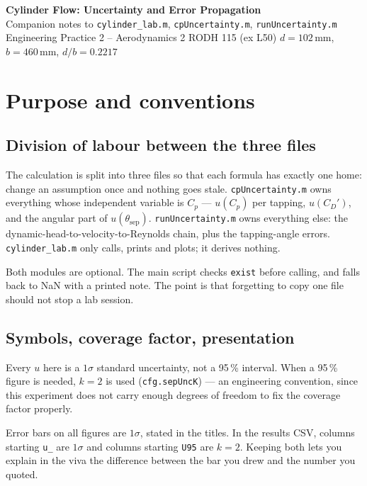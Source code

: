 \documentclass[11pt,a4paper]{article}
\newcommand{\Cp}{\ensuremath{C_p}}
\newcommand{\CD}{\ensuremath{C_D}}
\begin{document}
\begin{center}
{\LARGE\bfseries Cylinder Flow: Uncertainty and Error Propagation}\\[4pt]
{\large Companion notes to \texttt{cylinder\_lab.m}, \texttt{cpUncertainty.m}, \texttt{runUncertainty.m}}\\[8pt]
{\small Engineering Practice 2 -- Aerodynamics 2 \quad\textbar\quad RODH 115 (ex L50)
\quad\textbar\quad $d = 102$\,mm, $b = 460$\,mm, $d/b = 0.2217$}
\end{center}

\vspace{4pt}

\section{Purpose and conventions}

\subsection{Division of labour between the three files}

The calculation is split into three files so that each formula has exactly one home: change an
assumption once and nothing goes stale. \texttt{cpUncertainty.m} owns everything whose independent
variable is \Cp{} --- $u(\Cp)$ per tapping, $u(\CD')$, and the angular part of $u(\theta_{\text{sep}})$.
\texttt{runUncertainty.m} owns everything else: the dynamic-head-to-velocity-to-Reynolds chain, plus
the tapping-angle errors. \texttt{cylinder\_lab.m} only calls, prints and plots; it derives nothing.

Both modules are optional. The main script checks \texttt{exist} before calling, and falls back to
NaN with a printed note. The point is that forgetting to copy one file should not stop a lab session.

\subsection{Symbols, coverage factor, presentation}

Every $u$ here is a $1\sigma$ standard uncertainty, not a 95\,\% interval. When a 95\,\% figure is
needed, $k = 2$ is used (\texttt{cfg.sepUncK}) --- an engineering convention, since this experiment
does not carry enough degrees of freedom to fix the coverage factor properly.

Error bars on all figures are $1\sigma$, stated in the titles. In the results CSV, columns starting
\texttt{u\_} are $1\sigma$ and columns starting \texttt{U95} are $k=2$. Keeping both lets you explain
in the viva the difference between the bar you drew and the number you quoted.
\end{document}
